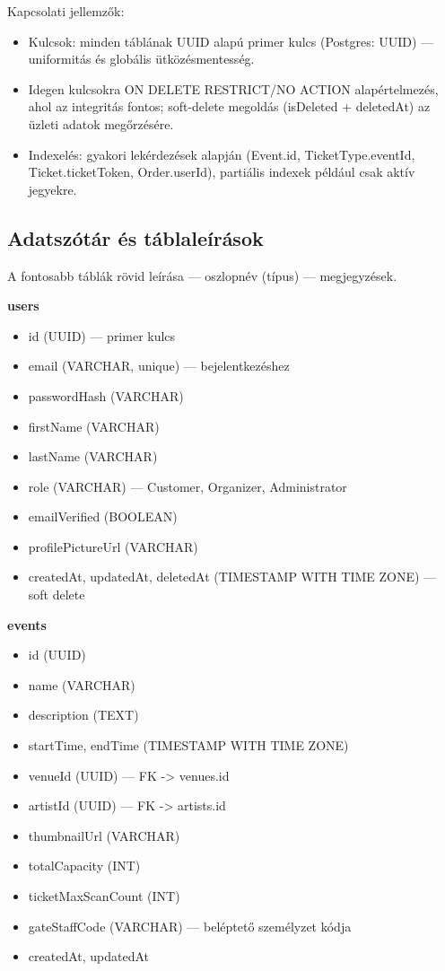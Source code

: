 \documentclass[colorlinks]{docs}
\theoremstyle{definition}
\theoremstyle{remark}
\begin{document}
Kapcsolati jellemzők:
\begin{itemize}
    \item Kulcsok: minden táblának UUID alapú primer kulcs (Postgres: UUID) — uniformitás és globális ütközésmentesség.
    \item Idegen kulcsokra ON DELETE RESTRICT/NO ACTION alapértelmezés, ahol az integritás fontos; soft-delete megoldás (isDeleted + deletedAt) az üzleti adatok megőrzésére.
    \item Indexelés: gyakori lekérdezések alapján (Event.id, TicketType.eventId, Ticket.ticketToken, Order.userId), partiális indexek például csak aktív jegyekre.
\end{itemize}

\subsection{Adatszótár és táblaleírások}
A fontosabb táblák rövid leírása — oszlopnév (típus) — megjegyzések.

\textbf{users}
\begin{itemize}
    \item id (UUID) — primer kulcs
    \item email (VARCHAR, unique) — bejelentkezéshez
    \item passwordHash (VARCHAR)
    \item firstName (VARCHAR)
    \item lastName (VARCHAR)
    \item role (VARCHAR) — Customer, Organizer, Administrator
    \item emailVerified (BOOLEAN)
    \item profilePictureUrl (VARCHAR)
    \item createdAt, updatedAt, deletedAt (TIMESTAMP WITH TIME ZONE) — soft delete
\end{itemize}

\textbf{events}
\begin{itemize}
    \item id (UUID)
    \item name (VARCHAR)
    \item description (TEXT)
    \item startTime, endTime (TIMESTAMP WITH TIME ZONE)
    \item venueId (UUID) — FK -> venues.id
    \item artistId (UUID) — FK -> artists.id
    \item thumbnailUrl (VARCHAR)
    \item totalCapacity (INT)
    \item ticketMaxScanCount (INT)
    \item gateStaffCode (VARCHAR) — beléptető személyzet kódja
    \item createdAt, updatedAt
\end{itemize}
\end{document}
